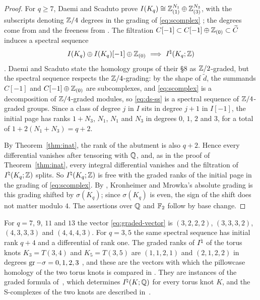 \begin{proof}
For $q\ge7$, Daemi and Scaduto prove $I(K_q)\cong\mathbb{Z}_{(1)}^{N_1}\oplus\mathbb{Z}_{(3)}^{N_3}$, with the subscripts
denoting $\mathbb{Z}/4$ degrees in the grading of \eqref{eq:scomplex} \cite[Prop.~8.30]{DS24}; the degrees come
from \cite[Prop.~8.28]{DS24} and the freeness from \cite[Rem.~8.27]{DS24}. The filtration
$C[-1]\subset C[-1]\oplus\mathbb{Z}_{(0)}\subset\widetilde C$ induces a spectral sequence
\begin{equation}\label{eq:ds-ss}
 I(K_q)\oplus I(K_q)[-1]\oplus\Z_{(0)}\ \Longrightarrow\ \Inat(K_q;\Z)
\end{equation}
\cite[(8.5)]{DS24}. Daemi and Scaduto state the homology groups of their \S8 as $\mathbb{Z}/2$-graded, but the
spectral sequence respects the $\mathbb{Z}/4$-grading: by the shape of $\widetilde d$, the summands $C[-1]$ and
$C[-1]\oplus\mathbb{Z}_{(0)}$ are subcomplexes, and \eqref{eq:scomplex} is a decomposition of $\mathbb{Z}/4$-graded
modules, so \eqref{eq:ds-ss} is a spectral sequence of $\mathbb{Z}/4$-graded groups. Since a class of degree $j$
in $I$ sits in degree $j+1$ in $I[-1]$, the initial page has ranks $1+N_3$, $N_1$, $N_1$ and $N_3$ in
degrees $0$, $1$, $2$ and $3$, for a total of $1+2(N_1+N_3)=q+2$.

By Theorem~\ref{thm:inat}, the rank of the abutment is also $q+2$. Hence every differential vanishes
after tensoring with $\mathbb{Q}$, and, as in the proof of Theorem~\ref{thm:inat}, every integral differential
vanishes and the filtration of $I^{\natural}(K_q;\mathbb{Z})$ splits. So $I^{\natural}(K_q;\mathbb{Z})$ is free with the graded ranks
of the initial page in the grading of \eqref{eq:scomplex}. By \cite[Thm.~8.9]{DS19}, Kronheimer and
Mrowka's absolute grading is this grading shifted by $\sigma(K_q)$; since $\sigma(K_q)$ is even, the sign
of the shift does not matter modulo $4$. The assertions over $\mathbb{Q}$ and $\mathbb{F}_2$ follow by base change.
\end{proof}

For $q=7$, $9$, $11$ and $13$ the vector \eqref{eq:graded-vector} is $(3,2,2,2)$, $(3,3,3,2)$, $(4,3,3,3)$
and $(4,4,4,3)$. For $q=3,5$ the same spectral sequence has initial rank $q+4$ and a differential of rank
one. The graded ranks of $I^{\natural}$ of the torus knots $K_3=T(3,4)$ and $K_5=T(3,5)$ are $(1,1,2,1)$ and
$(2,1,2,2)$ in degrees $\operatorname{gr}-\sigma=0,1,2,3$ \cite[(2.5) and Table~2]{WuebbenV}, and these are the vectors
with which the pillowcase homology of the two torus knots is compared in \cite{WuebbenV}. They are instances of
the graded formula of~\cite{WuebbenIV}, which determines $I^{\natural}(K;\mathbb{Q})$ for every torus knot $K$, and the S-complexes of
the two knots are described in~\cite{WuebbenI}.
